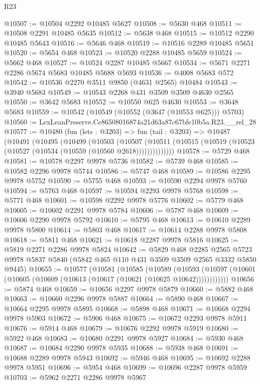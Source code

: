 \begin{lexlean}{R23}
\begin{coremodule}
@10507 := @10504 @2292 @10485 @5627
@10508 := @5630 @468
@10511 := @10508 @2291 @10485 @5635
@10512 := @5638 @468
@10515 := @10512 @2290 @10485 @5643
@10516 := @5646 @468
@10519 := @10516 @2289 @10485 @5651
@10520 := @5654 @468
@10523 := @10520 @2288 @10485 @5659
@10524 := @5662 @468
@10527 := @10524 @2287 @10485 @5667
@10534 := @5671 @2271 @2286 @5674 @5683 @10485 @5688 @5693
@10536 := @4008 @5683 @572
@10542 := @10536 @2270 @3511 @9850 (@4631 @2565) @10484
@10543 := @3940 @5683
@10549 := @10543 @2268 @431 @3509 @3509 @4630 @2565
@10550 := @3642 @5683
@10552 := @10550 @625 @4630
@10553 := @3648 @5683
@10559 := @10542 (@10549 (@10552 (@3647 (@10553 @625))) @5703)
@10560 := LexLeanPreserve.Ce86508016874a21d63a87c67bfe10b5a.R23.__rel_28
@10577 := @10480
    (fun (lets : @3203) =>
    fun (tail : @3203) =>
    @10487
      (@10491
        (@10495
          (@10499
            (@10503
              (@10507
                (@10511 (@10515 (@10519 (@10523 (@10527 (@10534 (@10559 (@10560 @2618))))))))))))))
@10578 := @5729 @468
@10581 := @10578 @2297 @9978 @5736
@10582 := @5739 @468
@10585 := @10582 @2296 @9978 @5744
@10586 := @5747 @468
@10589 := @10586 @2295 @9978 @5752
@10590 := @5755 @468
@10593 := @10590 @2294 @9978 @5760
@10594 := @5763 @468
@10597 := @10594 @2293 @9978 @5768
@10598 := @5771 @468
@10601 := @10598 @2292 @9978 @5776
@10602 := @5779 @468
@10605 := @10602 @2291 @9978 @5784
@10606 := @5787 @468
@10609 := @10606 @2290 @9978 @5792
@10610 := @5795 @468
@10613 := @10610 @2289 @9978 @5800
@10614 := @5803 @468
@10617 := @10614 @2288 @9978 @5808
@10618 := @5811 @468
@10621 := @10618 @2287 @9978 @5816
@10625 := @5819 @2271 @2286 @9978 @5824
@10642 := @5829
    @468
    @2285
    @2565
    @5723
    @9978
    @5837
    @5840
    (@5842 @465 @110 @431 @3509 @3509 @2565 @3332 @5850 @9445)
@10655 := @10577
    (@10581
      (@10585
        (@10589
          (@10593 (@10597 (@10601 (@10605 (@10609 (@10613 (@10617 (@10621 (@10625 @10642))))))))))))
@10656 := @5874 @468
@10659 := @10656 @2297 @9978 @5879
@10660 := @5882 @468
@10663 := @10660 @2296 @9978 @5887
@10664 := @5890 @468
@10667 := @10664 @2295 @9978 @5895
@10668 := @5898 @468
@10671 := @10668 @2294 @9978 @5903
@10672 := @5906 @468
@10675 := @10672 @2293 @9978 @5911
@10676 := @5914 @468
@10679 := @10676 @2292 @9978 @5919
@10680 := @5922 @468
@10683 := @10680 @2291 @9978 @5927
@10684 := @5930 @468
@10687 := @10684 @2290 @9978 @5935
@10688 := @5938 @468
@10691 := @10688 @2289 @9978 @5943
@10692 := @5946 @468
@10695 := @10692 @2288 @9978 @5951
@10696 := @5954 @468
@10699 := @10696 @2287 @9978 @5959
@10703 := @5962 @2271 @2286 @9978 @5967

\end{coremodule}
\end{lexlean}
